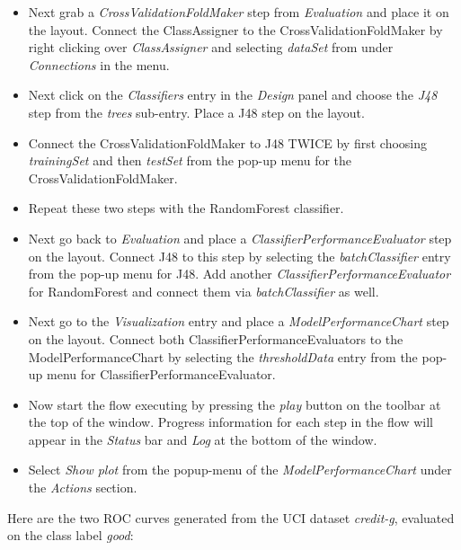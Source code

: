 \begin{itemize}
	\item Next grab a \textit{CrossValidationFoldMaker} step
          from \textit{Evaluation} and place it on the layout. Connect
          the ClassAssigner to the CrossValidationFoldMaker by right
          clicking over \textit{ClassAssigner} and selecting
          \textit{dataSet} from under \textit{Connections} in the
          menu.

	\item Next click on the \textit{Classifiers} entry in the
          \textit{Design} panel and choose the \textit{J48} step
          from the \textit{trees} sub-entry. Place a J48 step on
          the layout.

	\item Connect the CrossValidationFoldMaker to J48 TWICE by first choosing
	\textit{trainingSet} and then \textit{testSet} from the pop-up menu for the
	CrossValidationFoldMaker.

	\item Repeat these two steps with the RandomForest classifier.

	\item Next go back to \textit{Evaluation} and place a
	\textit{ClassifierPerformanceEvaluator} step on the layout. Connect J48
	to this step by selecting the \textit{batchClassifier} entry from the
	pop-up menu for J48. Add another \textit{ClassifierPerformanceEvaluator} for
	RandomForest and connect them via \textit{batchClassifier} as well.

	\item Next go to the \textit{Visualization} entry and place a 
	\textit{ModelPerformanceChart} step on the layout. Connect both 
	ClassifierPerformanceEvaluators to the ModelPerformanceChart by selecting 
	the \textit{thresholdData} entry from the pop-up menu for ClassifierPerformanceEvaluator.

	\item Now start the flow executing by pressing the
          \textit{play} button on the toolbar at the top of the
          window. Progress information for each step in the flow
          will appear in the \textit{Status} bar and \textit{Log} at
          the bottom of the window.
	
	\item Select \textit{Show plot} from the popup-menu of the 
	\textit{ModelPerformanceChart} under the \textit{Actions} section.
\end{itemize}

Here are the two ROC curves generated from the UCI dataset \textit{credit-g}, 
evaluated on the class label \textit{good}:

